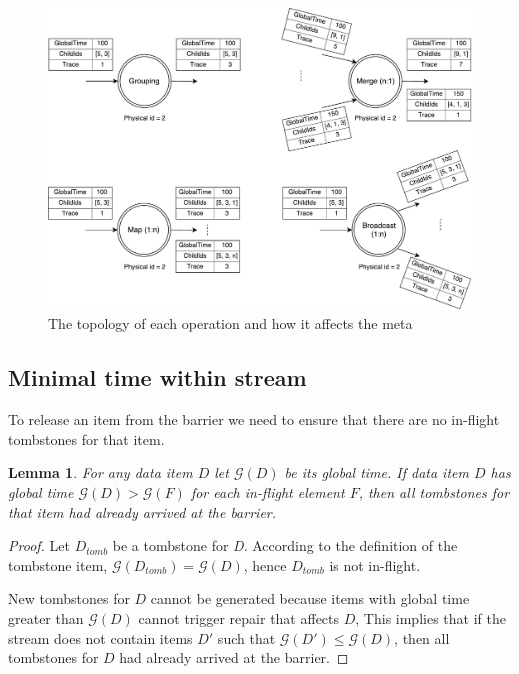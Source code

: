 \begin{figure}[ht]
  \centering
  \includegraphics[width=\linewidth]{pics/operations}
  \caption{The topology of each operation and how it affects the meta}
  \label {logical-graph-ops-figure}
\end{figure}

\label{mininal-time}

\subsection{Minimal time within stream}

To release an item from the barrier we need to ensure that there are no in-flight tombstones for that item. 

\newtheorem{minimal-time-claim}{Lemma}

\begin{minimal-time-claim}
For any data item $D$ let $\mathcal{G} (D)$ be its global time. 
  If data item $D$ has global time $\mathcal{G} (D) > \mathcal{G} (F)$ for each in-flight element $F$, 
  then all tombstones for that item had already arrived at the barrier.
\end{minimal-time-claim}

\begin{proof}
  Let $D_{tomb}$ be a tombstone for {\it D}. 
  According to the definition of the tombstone item, $\mathcal{G} (D_{tomb}) = \mathcal{G} (D)$, hence $D_{tomb}$ is not in-flight.
  
  New tombstones for $D$ cannot be generated because items with global time greater than $\mathcal{G} (D)$ cannot trigger repair that affects $D$,
  This implies that if the stream does not contain items $D\prime$ such that $\mathcal{G} (D\prime) \le \mathcal{G} (D)$, then all tombstones for $D$ had already arrived at the barrier. 
\end{proof}

